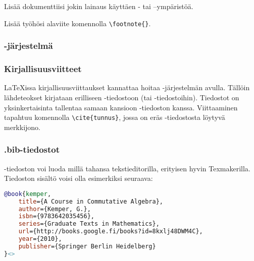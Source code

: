 \begin{fframe}
    \begin{harj}
        Lisää dokumenttiisi jokin lainaus käyttäen - tai --ympäristöä. 
    \end{harj}
    \begin{harj}
        Lisää työhösi alaviite komennolla \lstinline-\footnote{}-. 
    \end{harj}
\end{fframe}

\subsubsection{\BibTeX-järjestelmä}
\begin{fframe}
    \frametitle{Kirjallisuusviitteet}
    \LaTeX issa kirjallisuusviittaukset kannattaa hoitaa \BibTeX-järjestelmän avulla. 
    \pause
    \vaihto
    Tällöin lähdeteokset kirjataan erilliseen -tiedostoon (tai -tiedostoihin).
    \pause
    \vaihto
    Tiedostot on yksinkertaisinta tallentaa samaan kansioon -tiedoston kanssa.
    \pause
    \vaihto
    Viittaaminen tapahtuu komennolla \lstinline-\cite{tunnus}-, jossa  on eräs -tiedostosta löytyvä merkkijono.
\end{fframe}

\begin{fframe}
    \frametitle{.bib-tiedostot}
    -tiedoston voi luoda millä tahansa tekstieditorilla, erityisen hyvin Texmakerilla. 
    \pause
    \vaihto
    Tiedoston sisältö voisi olla esimerkiksi seuraava:\vaihto
    \begin{lstlisting}[language=BibTeX,basicstyle=\ttfamily\small]
@book{kemper,
    title={A Course in Commutative Algebra},
    author={Kemper, G.},
    isbn={9783642035456},
    series={Graduate Texts in Mathematics},
    url={http://books.google.fi/books?id=8kxlj48DWM4C},
    year={2010},
    publisher={Springer Berlin Heidelberg}
}<>
    \end{lstlisting}
\end{fframe}

